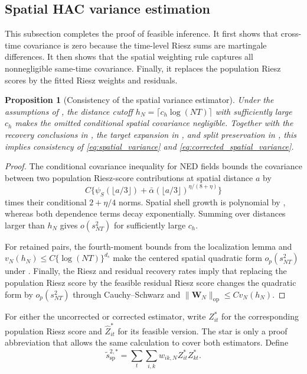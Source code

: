 \documentclass[11pt]{article}
\numberwithin{equation}{section}
\newtheorem{proposition}{Proposition}
\theoremstyle{remark}
\newcommand{\op}{\operatorname{op}}
\begin{document}
\subsection{Spatial HAC variance estimation}
\label{app:variance}

This subsection completes the proof of feasible inference. It first shows that cross-time covariance is zero because the time-level Riesz sums are martingale differences. It then shows that the spatial weighting rule captures all nonnegligible same-time covariance. Finally, it replaces the population Riesz scores by the fitted Riesz weights and residuals.

\begin{proposition}[Consistency of the spatial variance estimator]
\label{prop:spatial_consistency}
Under the assumptions of , the distance cutoff $h_N=\lceil c_h\log(NT)\rceil$ with sufficiently large $c_h$ makes the omitted conditional spatial covariance negligible. Together with the recovery conclusions in , the target expansion in , and split preservation in , this implies consistency of \eqref{eq:spatial_variance} and \eqref{eq:corrected_spatial_variance}.
\end{proposition}

\begin{proof}
The conditional covariance inequality for NED fields bounds the covariance between two population Riesz-score contributions at spatial distance $a$ by
$$
C\{\psi_S(\lfloor a/3\rfloor)+\bar\alpha(\lfloor a/3\rfloor)^{\eta/(8+\eta)}\}
$$
times their conditional $2+\eta/4$ norms. Spatial shell growth is polynomial by , whereas both dependence terms decay exponentially. Summing over distances larger than $h_N$ gives $o(s_{NT}^2)$ for sufficiently large $c_h$.

For retained pairs, the fourth-moment bounds from the localization lemma and $v_N(h_N)\le C\{\log(NT)\}^{d_s}$ make the centered spatial quadratic form $o_p(s_{NT}^2)$ under . Finally, the Riesz and residual recovery rates imply that replacing the population Riesz score by the feasible residual Riesz score changes the quadratic form by $o_p(s_{NT}^2)$ through Cauchy--Schwarz and $\|\bm W_N\|_{\op}\le Cv_N(h_N)$.
\end{proof}

For either the uncorrected or corrected estimator, write $Z_{it}^{*}$ for the corresponding population Riesz score and $\widehat Z_{it}^{*}$ for its feasible version. The star is only a proof abbreviation that allows the same calculation to cover both estimators. Define
$$
\widetilde s_{\mathrm{sp}}^{2,*}
=
\sum_t\sum_{i,k}
w_{ik,N}Z_{it}^{*}Z_{kt}^{*}.
$$
\end{document}
